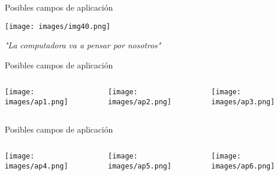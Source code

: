 \documentclass{bredelebeamer}
\begin{document}
\begin{frame}{Posibles campos de aplicación}
\begin{center}
\texttt{[image: images/img40.png]}\\
\end{center}
\begin{center}
\textit{"La computadora va a pensar por nosotros"}
\end{center}
\end{frame}

\begin{frame}{Posibles campos de aplicación}
\begin{columns}
\begin{column}{0.5\textwidth}
\begin{center}
\texttt{[image: images/ap1.png]}\\
\end{center}
\end{column}
\begin{column}{0.3\textwidth}
\begin{center}
\texttt{[image: images/ap2.png]}\\
\end{center}
\end{column}
\begin{column}{0.3\textwidth}
\begin{center}
\texttt{[image: images/ap3.png]}\\
\end{center}
\end{column}
\end{columns}
\end{frame}

\begin{frame}{Posibles campos de aplicación}
\begin{columns}
\begin{column}{0.5\textwidth}
\begin{center}
\texttt{[image: images/ap4.png]}
\end{center}
\end{column}
\begin{column}{0.3\textwidth}
\begin{center}
\texttt{[image: images/ap5.png]}
\end{center}
\end{column}
\begin{column}{0.23\textwidth}
\begin{center}
\texttt{[image: images/ap6.png]}
\end{center}
\end{column}
\end{columns}
\end{frame}
\end{document}
